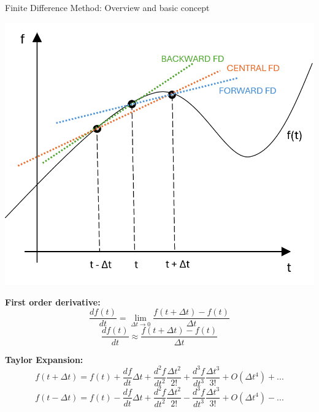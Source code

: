 \documentclass[10pt, aspectratio=54]{beamer}
\begin{document}
	
	\begin{frame}{Finite Difference Method: Overview and basic concept}
		\justifying
		
		\begin{minipage}{0.5\textwidth}
			\flushleft
			\includegraphics[width=\textwidth]{Figures/FDM.png}
		\end{minipage}
		\hfill
		\begin{minipage}{0.45\textwidth}
			\centering
			\textbf{First order derivative:} 
			\[
			\frac{d f(t)}{d t} = \lim_{\Delta t \to 0} \frac{f(t + \Delta t) - f(t)}{\Delta t}
			\]
			\[
			\frac{d f(t)}{d t} \approx \frac{f(t + \Delta t) - f(t)}{\Delta t}
			\]
		\end{minipage}
		
		\vspace{0.3cm}
		
		\textbf{Taylor Expansion:}
		\[
		f(t + \Delta t) = f(t) + \frac{d f}{d t} \Delta t + \frac{d^2 f}{d t^2} \frac{\Delta t^2}{2!} + \frac{d^3 f}{d t^3} \frac{\Delta t^3}{3!} + O(\Delta t^4) + ...
		\]
		\[
		f(t - \Delta t) = f(t) - \frac{d f}{d t} \Delta t + \frac{d^2 f}{d t^2} \frac{\Delta t^2}{2!} - \frac{d^3 f}{d t^3} \frac{\Delta t^3}{3!} + O(\Delta t^4) - ...
		\]
				
	\end{frame}
	
\end{document}
